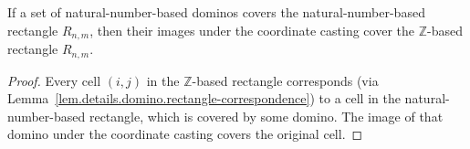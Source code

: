 \begin{lemma}
\label{lem.details.domino.toDominoZ-cover}
\leanhelper
\leanok
If a set of natural-number-based dominos covers the natural-number-based rectangle $R_{n,m}$,
then their images under the coordinate casting cover the $\mathbb{Z}$-based rectangle
$R_{n,m}$.
\end{lemma}

\begin{proof}
\leanok
Every cell $(i,j)$ in the $\mathbb{Z}$-based rectangle corresponds (via
Lemma~\ref{lem.details.domino.rectangle-correspondence}) to a cell in the
natural-number-based rectangle, which is covered by some domino. The image
of that domino under the coordinate casting covers the original cell.
\end{proof}
